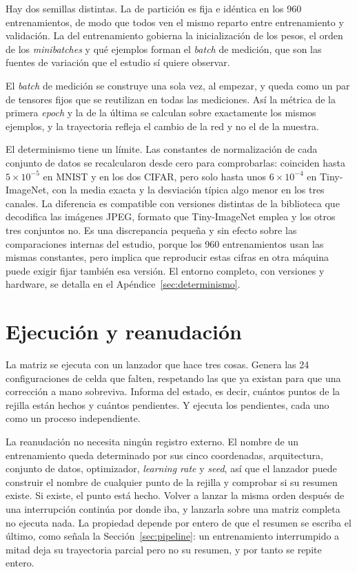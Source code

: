 Hay dos semillas distintas. La de partición es fija e idéntica en los 960 entrenamientos, de modo que todos ven el mismo reparto entre entrenamiento y validación. La del entrenamiento gobierna la inicialización de los pesos, el orden de los \emph{minibatches} y qué ejemplos forman el \emph{batch} de medición, que son las fuentes de variación que el estudio sí quiere observar.

El \emph{batch} de medición se construye una sola vez, al empezar, y queda como un par de tensores fijos que se reutilizan en todas las mediciones. Así la métrica de la primera \emph{epoch} y la de la última se calculan sobre exactamente los mismos ejemplos, y la trayectoria refleja el cambio de la red y no el de la muestra.

El determinismo tiene un límite. Las constantes de normalización de cada conjunto de datos se recalcularon desde cero para comprobarlas: coinciden hasta $5 \times 10^{-5}$ en MNIST y en los dos CIFAR, pero solo hasta unos $6 \times 10^{-4}$ en Tiny-ImageNet, con la media exacta y la desviación típica algo menor en los tres canales. La diferencia es compatible con versiones distintas de la biblioteca que decodifica las imágenes JPEG, formato que Tiny-ImageNet emplea y los otros tres conjuntos no. Es una discrepancia pequeña y sin efecto sobre las comparaciones internas del estudio, porque los 960 entrenamientos usan las mismas constantes, pero implica que reproducir estas cifras en otra máquina puede exigir fijar también esa versión. El entorno completo, con versiones y hardware, se detalla en el Apéndice~\ref{sec:determinismo}.

\section{Ejecución y reanudación}
\label{sec:ejecucion}

La matriz se ejecuta con un lanzador que hace tres cosas. Genera las 24 configuraciones de celda que falten, respetando las que ya existan para que una corrección a mano sobreviva. Informa del estado, es decir, cuántos puntos de la rejilla están hechos y cuántos pendientes. Y ejecuta los pendientes, cada uno como un proceso independiente.

La reanudación no necesita ningún registro externo. El nombre de un entrenamiento queda determinado por sus cinco coordenadas, arquitectura, conjunto de datos, optimizador, \emph{learning rate} y \emph{seed}, así que el lanzador puede construir el nombre de cualquier punto de la rejilla y comprobar si su resumen existe. Si existe, el punto está hecho. Volver a lanzar la misma orden después de una interrupción continúa por donde iba, y lanzarla sobre una matriz completa no ejecuta nada. La propiedad depende por entero de que el resumen se escriba el último, como señala la Sección~\ref{sec:pipeline}: un entrenamiento interrumpido a mitad deja su trayectoria parcial pero no su resumen, y por tanto se repite entero.


